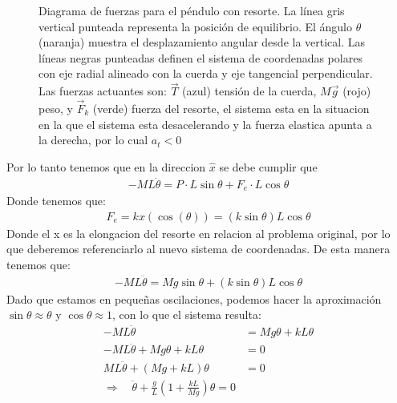 \documentclass[
  11pt,
  letterpaper,
   addpoints,
  ]{exam}
\begin{document}
\begin{questions}
\begin{solution}
\begin{figure}[H]
\caption{Diagrama de fuerzas para el péndulo con resorte. La línea gris vertical punteada representa la posición de equilibrio. El ángulo $\theta$ (naranja) muestra el desplazamiento angular desde la vertical. Las líneas negras punteadas definen el sistema de coordenadas polares con eje radial alineado con la cuerda y eje tangencial perpendicular. Las fuerzas actuantes son: $\vec{T}$ (azul) tensión de la cuerda, $M\vec{g}$ (rojo) peso, y $\vec{F}_k$ (verde) fuerza del resorte, el sistema esta en la situacion en la que el sistema esta desacelerando y la fuerza elastica apunta a la derecha, por lo cual $a_{t} < 0 $}
\end{figure}
Por lo tanto  tenemos que en la direccion $\hat{x}$ se debe cumplir que
\begin{align}
  -ML\ddot{\theta} = P \cdot L \sin\theta + F_e \cdot L \cos\theta
\end{align}
Donde tenemos que:
\begin{align}
  F_{e} = kx(\cos(\theta)) = (k\sin\theta)L \cos\theta
\end{align}
Donde el x es la elongacion del resorte en relacion al problema original, por lo que deberemos referenciarlo al nuevo sistema de coordenadas. De esta manera tenemos que:
\begin{align}
  -ML\ddot{\theta} = Mg\sin\theta + (k \sin\theta)L \cos\theta
\end{align}
Dado que estamos en pequeñas oscilaciones, podemos hacer la aproximación $\sin\theta \approx \theta$ y $\cos\theta \approx 1$, con lo que el sistema resulta:
\begin{align}
  -ML\ddot{\theta} &= Mg\theta + kL\theta \\
  -ML\ddot{\theta} + Mg\theta + kL\theta &= 0 \\
  ML\ddot{\theta} + (Mg + kL)\theta &= 0 \\
  \Rightarrow \quad
  \ddot{\theta} + \frac{g}{L}\left(1 + \frac{kL}{Mg}\right)\theta = 0
\end{align}


\end{solution}
\end{questions}
\end{document}
